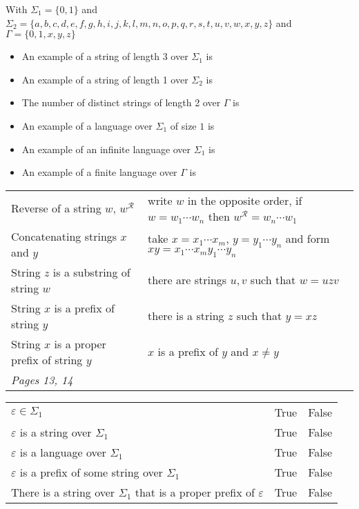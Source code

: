 With $\Sigma_1 = \{0,1\}$ and $\Sigma_2 = \{a,b,c,d,e,f,g,h,i,j,k,l,m,n,o,p,q,r,s,t,u,v,w,x,y,z\}$  and $\Gamma = \{0,1,x,y,z\}$
    
    \begin{itemize}
    \setlength{\itemsep}{10pt}
    \item[] An example of a string of length 3 over $\Sigma_1$ is 
    \item[] An example of  a string of length 1 over $\Sigma_2$ is 
    \item[] The number of distinct strings of length 2 over $\Gamma$ is
    \item[] An example of a language over $\Sigma_1$ of size $1$ is
    \item[] An example of an infinite language over $\Sigma_1$ is
    \item[] An example of  a finite language over $\Gamma$ is
    
    \end{itemize}
    
    \begin{center}
    \begin{tabular}{|ll|}
    \hline
    Reverse of a string $w$, $w^\mathcal{R}$  & write $w$  in  the opposite order, if $w = w_1 \cdots  w_n$ then $w^\mathcal{R} = w_n \cdots  w_1$\\
    Concatenating strings $x$ and $y$ & take $x = x_1 \cdots x_m$, $y=y_1 \cdots y_n$ and form $xy = x_1 \cdots x_m y_1 \cdots y_n$\\
    String $z$ is a substring of string $w$ & there are strings $u,v$ such that $w = uzv$\\
    String $x$ is a prefix of string $y$ & there is a string $z$ such that $y = xz$ \\
    String $x$ is a proper prefix of string $y$ & $x$ is a prefix of $y$ and $x \neq y$\\
    \hline
    {\it Pages 13, 14} & \\
    \hline
    \end{tabular}
    \end{center}
    
    \begin{center}
    \begin{tabular}{lcc}
    $\varepsilon \in \Sigma_1$ & True & False \\
    $\varepsilon$ is  a string over $\Sigma_1$ & True & False \\
    $\varepsilon$ is a language over $\Sigma_1$ & True & False \\
    $\varepsilon$ is a prefix of some string over  $\Sigma_1$ & True & False \\
    There is a string over $\Sigma_1$ that is a proper prefix of $\varepsilon$& True & False \\
    \end{tabular}
    \end{center}
    
